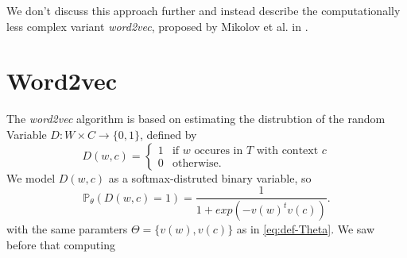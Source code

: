 \documentclass{amsart}
\theoremstyle{plain}
\theoremstyle{definition}
\renewcommand{\P}{\mathbb{P}}
\begin{document}
  We don't discuss this approach further and instead describe the computationally less complex variant \emph{word2vec}, proposed by Mikolov et al. in \cite{DBLP:journals/corr/MikolovSCCD13}.
  
  \section{Word2vec}
  The \emph{word2vec} algorithm is based on estimating the distrubtion of the random Variable $D : W \times C \rightarrow \{0, 1\}$, defined by
  \begin{equation*}
    D(w, c) = \begin{cases}
      1 & \text{if $w$ occures in $T$ with context $c$} \\
      0 & \text{otherwise}.
      \end{cases}
  \end{equation*}
  We model $D(w, c)$ as a softmax-distruted binary variable, so
  \begin{equation*}
    \P_\theta(D(w, c) = 1) = \frac{1}{1 + exp(- v(w)^t v(c))}.
  \end{equation*}
  with the same paramters $\Theta = \{v(w), v(c)\}$ as in \ref{eq:def-Theta}.
  We saw before that computing 
\printbibliography
\end{document}
